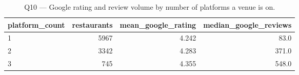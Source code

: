 \begin{table}[ht]
\centering
\caption{Q10 — Google rating and review volume by number of platforms a venue is on.}
\label{tab:q10_rating_by_coverage}
{\tiny
\begin{tabular}{lrrr}
\toprule
platform\_count & restaurants & mean\_google\_rating & median\_google\_reviews \\
\midrule
1 & 5967 & 4.242 & 83.0 \\
2 & 3342 & 4.283 & 371.0 \\
3 & 745 & 4.355 & 548.0 \\
\bottomrule
\end{tabular}
}
\end{table}
